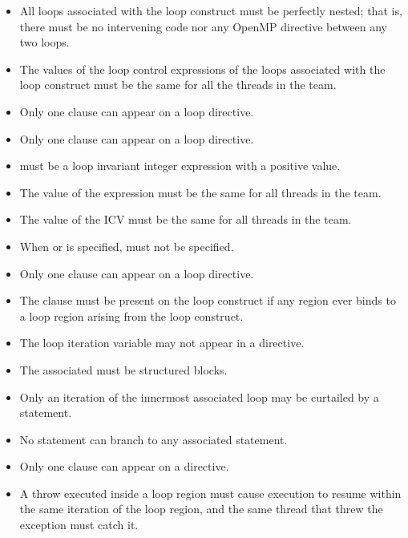 \begin{itemize}
\item All loops associated with the loop construct must be perfectly nested; that is, there 
must be no intervening code nor any OpenMP directive between any two loops.

\item The values of the loop control expressions of the loops associated with the loop 
construct must be the same for all the threads in the team.

\item Only one  clause can appear on a loop directive.

\item Only one  clause can appear on a loop directive.

\item {} must be a loop invariant integer expression with a positive value.

\item The value of the  expression must be the same for all threads in the team.

\item The value of the  ICV must be the same for all threads in the team.

\item When  or  is specified,  must 
not be specified.

\item Only one  clause can appear on a loop directive.

\item The  clause must be present on the loop construct if any  region 
ever binds to a loop region arising from the loop construct.

\item The loop iteration variable may not appear in a  directive.
\end{itemize}

\ccppspecificstart
\begin{itemize}
\item The associated  must be structured blocks.

\item Only an iteration of the innermost associated loop may be curtailed by a  
statement.

\item No statement can branch to any associated  statement.

\item Only one  clause can appear on a  directive.

\item A throw executed inside a loop region must cause execution to resume within the 
same iteration of the loop region, and the same thread that threw the exception must 
catch it.
\end{itemize}
\ccppspecificend

